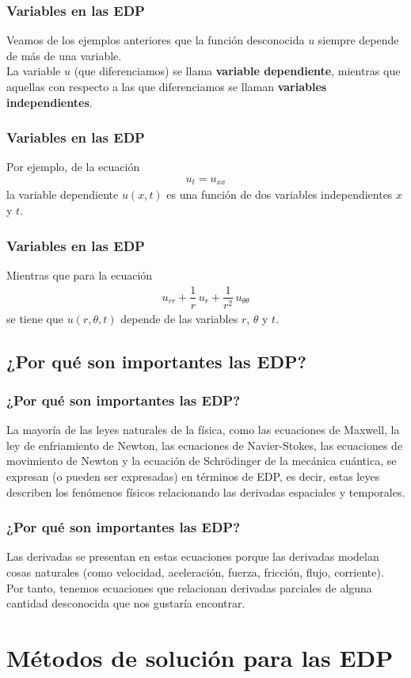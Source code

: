 \begin{frame}
\frametitle{Variables en las EDP}
Veamos de los ejemplos anteriores que la función desconocida $u$ siempre depende de más de una variable.
\\
\bigskip
La variable $u$ (que diferenciamos) se llama \textbf{variable dependiente}, mientras que aquellas con respecto a las que diferenciamos se llaman \textbf{variables independientes}.
\end{frame}
\begin{frame}
\frametitle{Variables en las EDP}
Por ejemplo, de la ecuación
\begin{align*}
u_{t} = u_{xx}
\end{align*}
la variable dependiente $u(x, t)$ es una función de dos variables independientes $x$ y $t$.
\end{frame}
\begin{frame}
\frametitle{Variables en las EDP}
Mientras que para la ecuación
\begin{align*}
u_{rr} + \dfrac{1}{r} \, u_{r} + \dfrac{1}{r^{2}} \, u_{\theta \theta}
\end{align*}
se tiene que $u(r, \theta, t)$ depende de las variables $r$, $\theta$ y $t$.
\end{frame}
\subsection{¿Por qué son importantes las EDP?}
\begin{frame}
\frametitle{¿Por qué son importantes las EDP?}
La mayoría de las leyes naturales de la física, como las ecuaciones de Maxwell, la ley de enfriamiento de Newton, las ecuaciones de Navier-Stokes, las ecuaciones de movimiento de Newton y la ecuación de Schrödinger de la mecánica cuántica, se expresan (o pueden ser expresadas) en términos de EDP, es decir, estas leyes describen los fenómenos físicos relacionando las derivadas espaciales y temporales.
\end{frame}
\begin{frame}
\frametitle{¿Por qué son importantes las EDP?}
Las derivadas se presentan en estas ecuaciones porque las derivadas modelan cosas naturales (como velocidad, aceleración, fuerza, fricción, flujo, corriente). 
\\
\bigskip
Por tanto, tenemos ecuaciones que relacionan derivadas parciales de alguna cantidad desconocida que nos gustaría encontrar.
\end{frame}
\section{Métodos de solución para las EDP}
